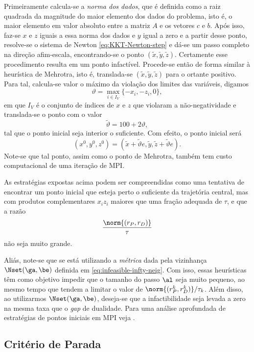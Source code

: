Primeiramente calcula-se a \emph{norma dos dados}, que é definida como a raiz
quadrada da magnitude do maior elemento dos dados do problema, isto é, o maior
elemento em valor absoluto entre a matriz $A$ e os vetores $c$ e  $b$.
Após isso, faz-se $x$ e $z$ iguais a essa norma dos dados e $y$ igual a zero e a
partir desse ponto, resolve-se o sistema de Newton \eqref{eq:KKT-Newton-step} e
dá-se  um passo completo na direção afim-escala, encontrando-se o ponto
$(\tilde{x},\tilde{y},\tilde{z})$. Certamente esse procedimento resulta em um
ponto infactível. Procede-se então de forma similar à heurística de Mehrotra,
isto é, translada-se $(\tilde{x},\tilde{y},\tilde{z})$ para o ortante positivo. 
Para tal, calcula-se valor
o máximo da violação dos limites das variáveis, digamos 
\[ \vartheta =
\max_{i\in I_V}\{-x_i,-z_i,0\}, \] em que $I_V$ é o conjunto de índices de $x$ e $z$
que violaram a não-negatividade e translada-se o ponto com o valor \[
\tilde{\vartheta}  = 100 + 2\vartheta, \] tal que o ponto inicial seja interior
o suficiente. Com efeito, o ponto inicial será \[ (x^0,y^0,z^0) = (\tilde{x}+
\tilde{\vartheta} e,\tilde{y},\tilde{z}+\tilde{\vartheta} e).
\]
Note-se que tal ponto, assim como o ponto de Mehrotra, também tem custo
computacional de uma iteração de \ac{MPI}.

 As estratégias expostas acima podem ser compreendidas
como uma tentativa de encontrar um ponto inicial que esteja perto o suficiente
da trajetória central, mas com  produtos complementares $x_iz_i$ 
maiores que uma fração adequada de $\tau$, e que a razão \[
\frac{\norm{(r_P,r_D)}}{\tau}
\] não seja muito grande. 

Aliás, note-se que se está  utilizando a \emph{métrica} dada pela vizinhança
$\Nset(\ga,\be)$ definida em \eqref{eq:infeasible-infty-neig}. Com isso, essas
heurísticas têm como objetivo impedir que o tamanho do passo $\al$ seja muito
pequeno, ao mesmo tempo que tendem a limitar  o valor de $\norm{(r_P^k
,r_D^k)}/{\tau_k}$. Além disso, ao utilizarmos $\Nset(\ga,\be)$, deseja-se que a
infactibilidade seja levada a zero na mesma taxa que o \emph{gap} de dualidade.
Para uma  análise aprofundada de estratégias de pontos iniciais em
\ac{MPI} veja \cite{Gertz:2004cw,DApuzzo:2009ks}.




  
\subsection{Critério de Parada}

